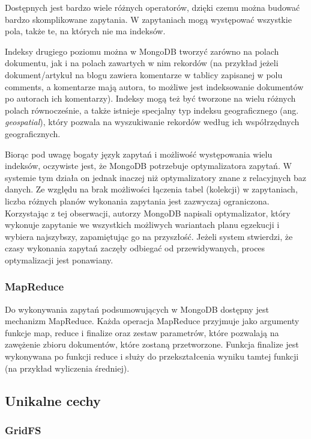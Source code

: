 Dostępnych jest bardzo wiele różnych operatorów, dzięki czemu można budować bardzo skomplikowane zapytania.
W zapytaniach mogą występować wszystkie pola, także te, na których nie ma indeksów.

Indeksy drugiego poziomu można w MongoDB tworzyć zarówno na polach dokumentu, jak i na polach zawartych w nim rekordów (na przykład jeżeli dokument/artykuł na blogu zawiera komentarze w tablicy zapisanej w polu comments, a komentarze mają autora, to możliwe jest indeksowanie dokumentów po autorach ich komentarzy).
Indeksy mogą też być tworzone na wielu różnych polach równocześnie, a także istnieje specjalny typ indeksu geograficznego (ang. \emph{geospatial}), który pozwala na wyszukiwanie rekordów według ich współrzędnych geograficznych.

Biorąc pod uwagę bogaty język zapytań i możliwość występowania wielu indeksów, oczywiste jest, że MongoDB potrzebuje optymalizatora zapytań.
W systemie tym działa on jednak inaczej niż optymalizatory znane z relacyjnych baz danych.
Ze względu na brak możliwości łączenia tabel (kolekcji) w zapytaniach, liczba różnych planów wykonania zapytania jest zazwyczaj ograniczona.
Korzystając z tej obserwacji, autorzy MongoDB napisali optymalizator, który wykonuje zapytanie we wszystkich możliwych wariantach planu egzekucji i wybiera najszybszy, zapamiętując go na przyszłość.
Jeżeli system stwierdzi, że czasy wykonania zapytań zaczęły odbiegać od przewidywanych, proces optymalizacji jest ponawiany.

\subsubsection*{MapReduce}

Do wykonywania zapytań podsumowujących w MongoDB dostępny jest mechanizm MapReduce.
Każda operacja MapReduce przyjmuje jako argumenty funkcje map, reduce i finalize oraz zestaw parametrów, które pozwalają na zawężenie zbioru dokumentów, które zostaną przetworzone.
Funkcja finalize jest wykonywana po funkcji reduce i służy do przekształcenia wyniku tamtej funkcji (na przykład wyliczenia średniej).

\subsection*{Unikalne cechy}

\subsubsection*{GridFS}

